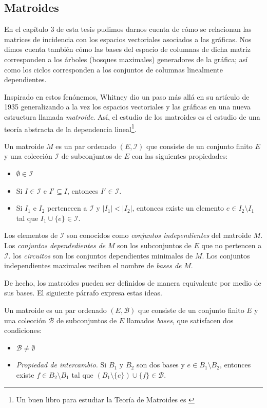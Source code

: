 \subsection{Matroides}
En el capítulo 3 de esta tesis pudimos darnos cuenta de cómo se relacionan las matrices de incidencia con los espacios vectoriales asociados a las gráficas. Nos dimos cuenta también cómo las bases del espacio de columnas de dicha matriz corresponden a los árboles (bosques maximales) generadores de la gráfica; así como los ciclos corresponden a los conjuntos de columnas linealmente dependientes.

Inspirado en estos fenónemos, Whitney dio un paso más allá en su artículo \cite{Whitney1935} de 1935 generalizando a la vez los espacios vectoriales y las gráficas en una nueva estructura llamada \textit{matroide}. Así, el estudio de los matroides es el estudio de una teoría abstracta de la dependencia lineal\footnote{Un buen libro para estudiar la Teoría de Matroides es \cite{Oxley}}.

Un matroide $M$ es un par ordenado $(E,\mathcal{I})$ que consiste de un conjunto finito $E$ y una colección $\mathcal{I}$ de subconjuntos de $E$ con las siguientes propiedades:

\begin{itemize}
    \item $\emptyset \in \mathcal{I}$
    \item Si $I\in \mathcal{I}$ e $I' \subseteq I$, entonces $I'\in \mathcal{I}$.
    \item Si $I_{1}$ e $I_{2}$ pertenecen a $\mathcal{I}$ y $|I_{1}|<|I_{2}|$, entonces existe un elemento $e \in I_{2} \setminus I_{1}$ tal que $I_{1} \cup \{e\} \in \mathcal{I}.$
\end{itemize}

Los elementos de $\mathcal{I}$ son conocidos como \textit{conjuntos independientes} del matroide $M$. Los \textit{conjuntos dependedientes de} $M$ son los subconjuntos de $E$ que no pertencen a $\mathcal{I}$. los \textit{circuitos} son los conjuntos dependientes minimales de $M$. Los conjuntos independientes maximales reciben el nombre de \textit{bases de} $M$. 

De hecho, los matroides pueden ser definidos de manera equivalente por medio de sus bases. El siguiente párrafo expresa estas ideas.

Un matroide es un par ordenado $(E, \mathcal{B})$ que consiste de un conjunto finito $E$ y una colección $\mathcal{B}$ de subconjuntos de $E$ llamados \textit{bases}, que satisfacen dos condiciones:
\begin{itemize}
    \item $\mathcal{B} \neq \emptyset$
    \item \textit{Propiedad de intercambio.} Si $B_{1}$ y $B_{2}$ son dos bases y $e \in B_{1}\setminus B_{2}$, entonces existe $f \in B_{2}\setminus B_{1}$ tal que $(B_{1} \setminus \{e\})\cup \{f\} \in \mathcal{B}$.
\end{itemize}

